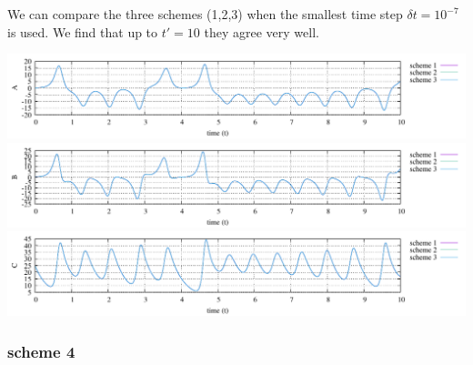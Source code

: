 We can compare the three schemes (1,2,3) when the smallest time 
step $\delta t=10^{-7}$ is used.
We find that up to $t'=10$ they agree very well.
\begin{center}
\includegraphics[width=16cm]{python_codes/fieldstone_156/results/A.pdf}\\
\includegraphics[width=16cm]{python_codes/fieldstone_156/results/B.pdf}\\
\includegraphics[width=16cm]{python_codes/fieldstone_156/results/C.pdf}
\end{center}


\subsubsection*{scheme 4}


